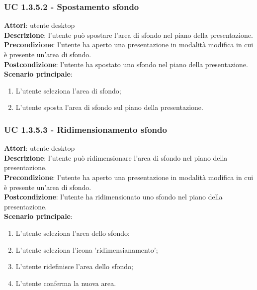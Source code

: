 \subsubsection{UC 1.3.5.2 - Spostamento sfondo}{
	\label{uc1.3.5.2}
	\textbf{Attori}: utente desktop \\
	\textbf{Descrizione}: l'utente può spostare l'area di sfondo nel piano della presentazione. \\
	\textbf{Precondizione}: l'utente ha aperto una presentazione in modalità modifica in cui è presente un'area di sfondo.	\\
	\textbf{Postcondizione}: l'utente ha spostato uno sfondo nel piano della presentazione.	\\
	\textbf{Scenario principale}:
	\begin{enumerate}
		\item L'utente seleziona l'area di sfondo;
		\item L'utente sposta l'area di sfondo sul piano della presentazione.
	\end{enumerate}
}
\subsubsection{UC 1.3.5.3 - Ridimensionamento sfondo}{
	\label{uc1.3.5.3}
	\textbf{Attori}: utente desktop \\
	\textbf{Descrizione}: l'utente può ridimensionare l'area di sfondo nel piano della presentazione. \\
	\textbf{Precondizione}: l'utente ha aperto una presentazione in modalità modifica in cui è presente un'area di sfondo.	\\
	\textbf{Postcondizione}: l'utente ha ridimensionato uno sfondo nel piano della presentazione.	\\
	\textbf{Scenario principale}:
	\begin{enumerate}
		\item L'utente seleziona l'area dello sfondo;
		\item L'utente seleziona l'icona 'ridimensianamento';
		\item L'utente ridefinisce l'area dello sfondo;
		\item L'utente conferma la nuova area.
	\end{enumerate}
}
